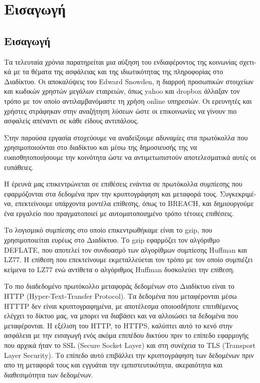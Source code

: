 \chapter{Εισαγωγή}\label{ch:intro}

\section{Εισαγωγή}\label{sec:intro}

Τα τελευταία χρόνια παρατηρείται μια αύξηση του ενδιαφέροντος της κοινωνίας
σχετι- κά με τα θέματα της ασφάλειας και της ιδιωτικότητας της πληροφορίας στο
Διαδίκτυο. Οι αποκαλύψεις του Edward Snowden, η διαρροή προσωπικών στοιχείων και
κωδικών χρηστών μεγάλων εταιρειών, όπως yahoo και dropbox άλλαξαν τον τρόπο
με τον οποίο αντιλαμβανόμαστε τη χρήση online υπηρεσιών. Οι ερευνητές και
χρήστες στράφηκαν στην αναζήτηση λύσεων ώστε οι επικοινωνίες να γίνουν πιο
ασφαλείς απέναντι σε κάθε είδους αντιπάλους.

Στην παρούσα εργασία στοχεύουμε να αναδείξουμε αδυναμίες στα πρωτόκολλα
που χρησιμοποιούνται στο διαδίκτυο και μέσω της δημοσιευσής της να 
ευαισθητοποιήσουμε την κοινότητα ώστε να αντιμετωπιστούν αποτελεσματικά αυτές
οι ευπάθειες.

Η έρευνά μας επικεντρώνεται σε επιθέσεις ενάντια σε πρωτόκολλα συμπίεσης που
εφαρμόζονται στα δεδομένα πριν την κρυπτογράφηση και μεταφορά τους. Συγκεκριμέ- να,
επεκτείνουμε υπάρχοντα μοντέλα επίθεσης, όπως το BREACH, και δημιουργούμε ένα εργαλείο
που πραγματοποιεί με αυτοματοποιημένο τρόπο τέτοιες επιθέσεις.

Το λογισμικό συμπίεσης στο οποίο επικεντρωθήκαμε είναι το gzip, που 
χρησιμοποιείται ευρέως στο Διαδίκτυο. Το gzip εφαρμόζει τον αλγόριθμο
DEFLATE, που αποτελεί τον συνδυασμό των αλγορίθμων συμπίεσης Huffman
και LZ77. Η επίθεση που επεκτείνουμε εκμεταλλεύεται τον τρόπο με τον
οποίο συμπιέζει κείμενα το LZ77 ενώ αντίθετα ο αλγόριθμος Huffman
δυσκολεύει την επίθεση.

Το πιο διαδεδομένο πρωτόκολλο μεταφοράς δεδομένων στο Διαδίκτυο είναι το
HTTP (Hyper-Text-Transfer Protocol). Τα δεδομένα που μεταφέρονται μέσω HTTTP
δεν είναι κρυπτογραφημένα, με αποτέλεσμα οποιοσδήποτε επιτιθέμενος ελέγχει
το δίκτυο μας, να μπορει να διαβάσει και να αλλοιώσει τα δεδομένα που μεταφέρονται.
Η εξέλιση του HTTP, το HTTPS, καλύπτει αυτό το κενό στην ασφάλεια με την εισαγωγή
ενός ακόμα επιπέδου δικτύου πριν το επίπεδο εφαρμογής που αρχικά ήταν το SSL 
(Secure Socket Layer) και στη συνέχεια το TLS (Transport Layer Security). Το επίπεδο αυτό
επιβάλλει την κρυπτογράφηση των δεδομένων πριν  απο τη μεταφορά τους και εγγυάται
την εμπιστευτικότητα, ακεραιότητα και διαθεσιμότητα των δεδομένων.

